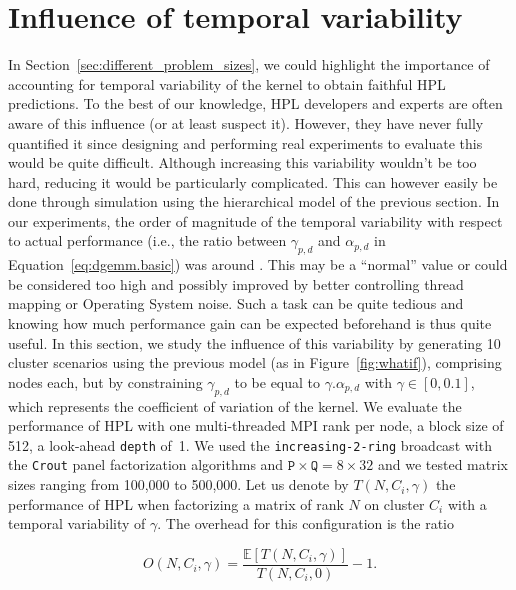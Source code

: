     \section{Influence of \dgemm temporal variability}%
    \label{sec:influence_of_temporal_variability}
        In Section~\ref{sec:different_problem_sizes}, we could highlight the importance of accounting for temporal
        variability of the \dgemm kernel to obtain faithful HPL predictions. To the best of our knowledge, HPL
        developers and experts are often aware of this influence (or at least suspect it). However, they have never
        fully quantified it since designing and performing real experiments to evaluate this would be quite difficult.
        Although increasing this variability wouldn't be too hard, reducing it would be particularly complicated. This
        can however easily be done through simulation using the hierarchical model of the previous section. In our
        experiments, the order of magnitude of the temporal variability with respect to actual performance (i.e., the
        ratio between \(\gamma_{p,d}\) and \(\alpha_{p,d}\) in Equation~\eqref{eq:dgemm.basic}) was around
        . This may be a ``normal'' value or could be considered too high and possibly improved by
        better controlling thread mapping or Operating System noise. Such a task can be quite tedious and knowing how
        much performance gain can be expected beforehand is thus quite useful. In this section, we study the influence
        of this variability by generating 10 cluster scenarios using the previous model (as in Figure~\ref{fig:whatif}),
        comprising  nodes each, but by constraining \(\gamma_{p,d}\) to be equal to \(\gamma.\alpha_{p,d}\)
        with \(\gamma\in[0,0.1]\), which represents the coefficient of variation of the \dgemm kernel. We evaluate the
        performance of HPL with one multi-threaded MPI rank per node, a block size of 512, a look-ahead \texttt{depth}
        of 1.  We used the \texttt{increasing-2-ring} broadcast with the \texttt{Crout} panel factorization algorithms
        and \(\texttt{P}\times\texttt{Q}=8\times32\) and we tested matrix sizes ranging from 100,000 to 500,000. Let us
        denote by \(T(N,C_i,\gamma)\) the performance of HPL when factorizing a matrix of rank \(N\) on cluster \(C_i\)
        with a temporal variability of \(\gamma\). The overhead for this configuration is the ratio

        \begin{equation*}
            O(N,C_i,\gamma) = \frac{\mathbb{E}[T(N,C_i,\gamma)]}{T(N,C_i,0)}-1.
        \end{equation*}

